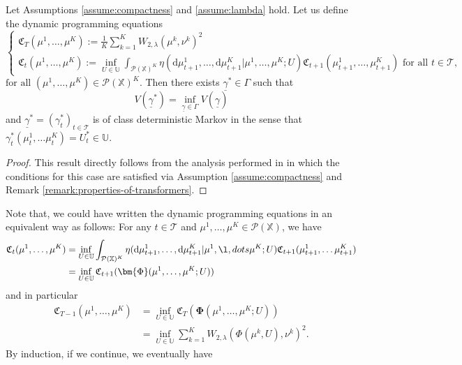 \documentclass[11pt]{article}
\newcommand{\XX}{\mathbb{X}}
\newcommand{\UU}{\mathbb{U}}
\newcommand{\cP}{\mathcal{P}}
\newcommand{\cT}{\mathcal{T}}
\newcommand{\fC}{\mathfrak{C}}
\newcommand{\de}{\mathrm{d}} %
\begin{document}
\begin{theorem}\label{thm:transformers-optimality}
    Let Assumptions \ref{assume:compactness} and \ref{assume:lambda} hold. Let us define the dynamic programming equations
    \begin{equation}
        \begin{cases}
            \displaystyle\fC_T(\mu^1,\ldots,\mu^K) :=  \frac{1}{K}\sum_{k=1}^K W_{2,\lambda}(\mu^k,\nu^k)^2 \\
            \displaystyle\fC_t(\mu^1,\ldots,\mu^K) := \inf_{U\in\UU}\int_{\cP(\XX)^K}\eta(\de\mu_{t+1}^1,\ldots,\de\mu_{t+1}^K|\mu^1,\ldots,\mu^K; U)\fC_{t+1}(\mu_{t+1}^1,\ldots,\mu_{t+1}^K) \text{ for all $t\in\cT$},
        \end{cases}
    \end{equation}
    $\text{for all } (\mu^1,\ldots,\mu^K)\in\cP(\XX)^K$. Then there exists $\underline{\gamma}^*\in\Gamma$ such that
    \begin{equation}
        V(\underline{\gamma}^*) = \inf_{\underline{\gamma}\in\Gamma}V(\underline{\gamma})
    \end{equation}
    and $\underline{\gamma}^* = (\gamma_t^*)_{t\in\cT}$ is of class deterministic Markov in the sense that $\gamma_t^*(\mu_t^1,\ldots\mu_t^K) = U_t^*\in\UU$.
\end{theorem}
\begin{proof}
    This result directly follows from the analysis performed in \cite[Chapter 2]{hernandez2012discrete} in which the conditions for this case are satisfied via Assumption \ref{assume:compactness} and Remark \ref{remark:properties-of-transformers}.
\end{proof}
Note that, we could have written the dynamic programming equations in an equivalent way as follows: For any $t\in\cT$ and $\mu^1,\ldots,\mu^K\in\cP(\XX)$, we have
\begin{align*}
    \fC_t(\mu^1,\ldots,\mu^K) &= \inf_{U\in\UU}\int_{\cP(\XX)^K}\eta(\de\mu_{t+1}^1,\ldots,\de\mu_{t+1}^K|\mu^1,\l,dots\mu^K; U)\fC_{t+1}(\mu_{t+1}^1,\ldots\mu_{t+1}^K) \\
    &= \inf_{U\in\UU}\fC_{t+1}(\bm{\Phi}(\mu^1,\ldots,\mu^K; U))
\end{align*}
and in particular
\begin{align*}
    \fC_{T-1}(\mu^1,\ldots,\mu^K) &= \inf_{U\in\UU}\fC_T(\bm{\Phi}(\mu^1,\ldots,\mu^K; U))\\
    &= \inf_{U\in\UU}\sum_{k=1}^K W_{2,\lambda}(\Phi(\mu^k, U),\nu^k)^2.
\end{align*}
By induction, if we continue, we eventually have
\end{document}

